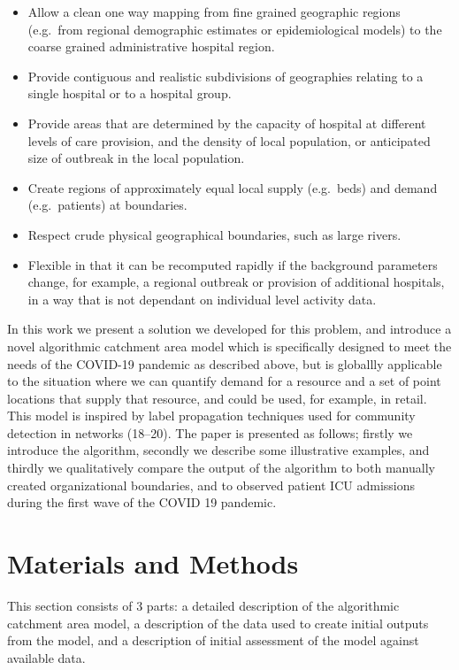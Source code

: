 \documentclass[
]{article}
\providecommand{\tightlist}{%
  \setlength{\itemsep}{0pt}\setlength{\parskip}{0pt}}
\begin{document}
\begin{itemize}
\tightlist
\item
  Allow a clean one way mapping from fine grained geographic regions
  (e.g.~from regional demographic estimates or epidemiological models)
  to the coarse grained administrative hospital region.
\item
  Provide contiguous and realistic subdivisions of geographies relating
  to a single hospital or to a hospital group.
\item
  Provide areas that are determined by the capacity of hospital at
  different levels of care provision, and the density of local
  population, or anticipated size of outbreak in the local population.
\item
  Create regions of approximately equal local supply (e.g.~beds) and
  demand (e.g.~patients) at boundaries.
\item
  Respect crude physical geographical boundaries, such as large rivers.
\item
  Flexible in that it can be recomputed rapidly if the background
  parameters change, for example, a regional outbreak or provision of
  additional hospitals, in a way that is not dependant on individual
  level activity data.
\end{itemize}

In this work we present a solution we developed for this problem, and
introduce a novel algorithmic catchment area model which is specifically
designed to meet the needs of the COVID-19 pandemic as described above,
but is globallly applicable to the situation where we can quantify
demand for a resource and a set of point locations that supply that
resource, and could be used, for example, in retail. This model is
inspired by label propagation techniques used for community detection in
networks (18--20). The paper is presented as follows; firstly we
introduce the algorithm, secondly we describe some illustrative
examples, and thirdly we qualitatively compare the output of the
algorithm to both manually created organizational boundaries, and to
observed patient ICU admissions during the first wave of the COVID 19
pandemic.

\hypertarget{materials-and-methods}{%
\section{Materials and Methods}\label{materials-and-methods}}

This section consists of 3 parts: a detailed description of the
algorithmic catchment area model, a description of the data used to
create initial outputs from the model, and a description of initial
assessment of the model against available data.
\end{document}
